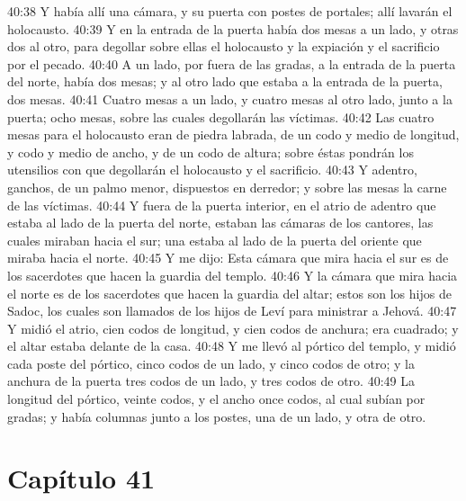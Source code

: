40:38 Y había allí una cámara, y su puerta con postes de portales; allí lavarán el holocausto.   
40:39 Y en la entrada de la puerta había dos mesas a un lado, y otras dos al otro, para degollar sobre ellas el holocausto y la expiación y el sacrificio por el pecado.   
40:40 A un lado, por fuera de las gradas, a la entrada de la puerta del norte, había dos mesas; y al otro lado que estaba a la entrada de la puerta, dos mesas.   
40:41 Cuatro mesas a un lado, y cuatro mesas al otro lado, junto a la puerta; ocho mesas, sobre las cuales degollarán las víctimas.   
40:42 Las cuatro mesas para el holocausto eran de piedra labrada, de un codo   y medio de longitud, y codo y medio de ancho, y de un codo de altura; sobre éstas pondrán los utensilios con que degollarán el holocausto y el sacrificio. 
40:43 Y adentro, ganchos, de un palmo menor, dispuestos en derredor; y sobre las mesas la carne de las víctimas.   
40:44 Y fuera de la puerta interior, en el atrio de adentro que estaba al lado de la puerta del norte, estaban las cámaras de los cantores, las cuales miraban hacia el sur; una estaba al lado de la puerta del oriente que miraba hacia el norte.   
40:45 Y me dijo: Esta cámara que mira hacia el sur es de los sacerdotes que hacen la guardia del templo.   
40:46 Y la cámara que mira hacia el norte es de los sacerdotes que hacen la guardia del altar; estos son los hijos de Sadoc, los cuales son llamados de los hijos de Leví para ministrar a Jehová.   
40:47 Y midió el atrio, cien codos   de longitud, y cien codos de anchura; era cuadrado; y el altar estaba delante de la casa.   
40:48 Y me llevó al pórtico del templo, y midió cada poste del pórtico, cinco codos   de un lado, y cinco codos de otro; y la anchura de la puerta tres codos de un lado, y tres codos de otro.   
40:49 La longitud del pórtico, veinte codos, y el ancho once codos, al cual subían por gradas; y había columnas junto a los postes, una de un lado, y otra de otro.   
\section*{Capítulo 41 } 
  
